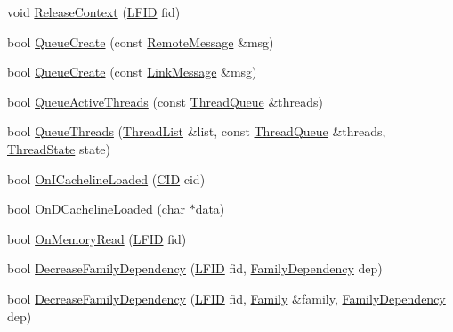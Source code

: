\begin{DoxyCompactItemize}
\item 
void \hyperlink{class_simulator_1_1drisc_1_1_allocator_a7116ae9b69b890498975d4b808d916fe}{Release\+Context} (\hyperlink{namespace_simulator_aaccbc706b2d6c99085f52f6dfc2333e4}{L\+F\+I\+D} fid)
\item 
bool \hyperlink{class_simulator_1_1drisc_1_1_allocator_afbec6b695e3555da3593c42f031dc197}{Queue\+Create} (const \hyperlink{struct_simulator_1_1drisc_1_1_remote_message}{Remote\+Message} \&msg)
\item 
bool \hyperlink{class_simulator_1_1drisc_1_1_allocator_a4ab50a75d30ba99489332b4b9b934b65}{Queue\+Create} (const \hyperlink{struct_simulator_1_1drisc_1_1_link_message}{Link\+Message} \&msg)
\item 
bool \hyperlink{class_simulator_1_1drisc_1_1_allocator_aaa6c02339182aadd2d6caf0609852b9c}{Queue\+Active\+Threads} (const \hyperlink{struct_simulator_1_1_thread_queue}{Thread\+Queue} \&threads)
\item 
bool \hyperlink{class_simulator_1_1drisc_1_1_allocator_a3b17e91b304be557a917922101d0f009}{Queue\+Threads} (\hyperlink{class_simulator_1_1drisc_1_1_allocator_acee4df99e4e6a73556f46dd8ad5aa6e1}{Thread\+List} \&list, const \hyperlink{struct_simulator_1_1_thread_queue}{Thread\+Queue} \&threads, \hyperlink{namespace_simulator_a5450f6fb4b10ec16b290049311b8d5d0}{Thread\+State} state)
\item 
bool \hyperlink{class_simulator_1_1drisc_1_1_allocator_a69167e032a26ac9d6f52e0457c1b764d}{On\+I\+Cacheline\+Loaded} (\hyperlink{namespace_simulator_a97f45fafcb1aafc0f269a19608b39d60}{C\+I\+D} cid)
\item 
bool \hyperlink{class_simulator_1_1drisc_1_1_allocator_afac644895b1ea204ce4d060f382dd4ca}{On\+D\+Cacheline\+Loaded} (char $\ast$data)
\item 
bool \hyperlink{class_simulator_1_1drisc_1_1_allocator_a1743acbdeaffe848ef3ded06ee9b8058}{On\+Memory\+Read} (\hyperlink{namespace_simulator_aaccbc706b2d6c99085f52f6dfc2333e4}{L\+F\+I\+D} fid)
\item 
bool \hyperlink{class_simulator_1_1drisc_1_1_allocator_a8fb2331b85b645fe2063c9d22972c967}{Decrease\+Family\+Dependency} (\hyperlink{namespace_simulator_aaccbc706b2d6c99085f52f6dfc2333e4}{L\+F\+I\+D} fid, \hyperlink{namespace_simulator_1_1drisc_ac6be077f11d2c5eb93b6ce2371bf67f4}{Family\+Dependency} dep)
\item 
bool \hyperlink{class_simulator_1_1drisc_1_1_allocator_a845ad6443a2a15413437746bf588f8f8}{Decrease\+Family\+Dependency} (\hyperlink{namespace_simulator_aaccbc706b2d6c99085f52f6dfc2333e4}{L\+F\+I\+D} fid, \hyperlink{struct_simulator_1_1drisc_1_1_family}{Family} \&family, \hyperlink{namespace_simulator_1_1drisc_ac6be077f11d2c5eb93b6ce2371bf67f4}{Family\+Dependency} dep)

\end{DoxyCompactItemize}
